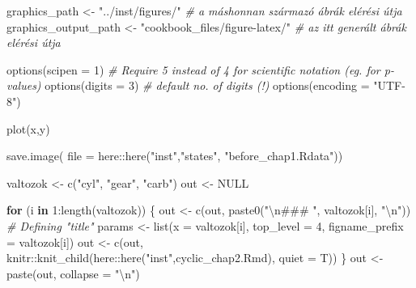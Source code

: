 \documentclass[
]{article}
\newenvironment{Shaded}{\begin{snugshade}}{\end{snugshade}}
\newcommand{\AttributeTok}[1]{\textcolor[rgb]{0.77,0.63,0.00}{#1}}
\newcommand{\CommentTok}[1]{\textcolor[rgb]{0.56,0.35,0.01}{\textit{#1}}}
\newcommand{\ConstantTok}[1]{\textcolor[rgb]{0.00,0.00,0.00}{#1}}
\newcommand{\ControlFlowTok}[1]{\textcolor[rgb]{0.13,0.29,0.53}{\textbf{#1}}}
\newcommand{\DecValTok}[1]{\textcolor[rgb]{0.00,0.00,0.81}{#1}}
\newcommand{\FunctionTok}[1]{\textcolor[rgb]{0.00,0.00,0.00}{#1}}
\newcommand{\NormalTok}[1]{#1}
\newcommand{\OtherTok}[1]{\textcolor[rgb]{0.56,0.35,0.01}{#1}}
\newcommand{\SpecialCharTok}[1]{\textcolor[rgb]{0.00,0.00,0.00}{#1}}
\newcommand{\StringTok}[1]{\textcolor[rgb]{0.31,0.60,0.02}{#1}}
\begin{document}
\begin{Shaded}
\begin{Highlighting}[]
\NormalTok{graphics\_path }\OtherTok{\textless{}{-}} \StringTok{"../inst/figures/"}            \CommentTok{\# a máshonnan származó ábrák elérési útja}
\NormalTok{graphics\_output\_path }\OtherTok{\textless{}{-}} \StringTok{"cookbook\_files/figure{-}latex/"} \CommentTok{\# az itt generált ábrák elérési útja}

\FunctionTok{options}\NormalTok{(}\AttributeTok{scipen =} \DecValTok{1}\NormalTok{) }\CommentTok{\# Require 5 instead of 4 for scientific notation (eg. for p{-}values)}
\FunctionTok{options}\NormalTok{(}\AttributeTok{digits =} \DecValTok{3}\NormalTok{) }\CommentTok{\# default no. of digits (!) }
\FunctionTok{options}\NormalTok{(}\AttributeTok{encoding =} \StringTok{"UTF{-}8"}\NormalTok{) }

\FunctionTok{plot}\NormalTok{(x,y)}

\FunctionTok{save.image}\NormalTok{( }\AttributeTok{file =}\NormalTok{ here}\SpecialCharTok{::}\FunctionTok{here}\NormalTok{(}\StringTok{"inst"}\NormalTok{,}\StringTok{"states"}\NormalTok{, }\StringTok{"before\_chap1.Rdata"}\NormalTok{))}

\NormalTok{valtozok }\OtherTok{\textless{}{-}} \FunctionTok{c}\NormalTok{(}\StringTok{"cyl"}\NormalTok{, }\StringTok{"gear"}\NormalTok{, }\StringTok{"carb"}\NormalTok{)}
\NormalTok{out }\OtherTok{\textless{}{-}} \ConstantTok{NULL}

\ControlFlowTok{for}\NormalTok{ (i }\ControlFlowTok{in} \DecValTok{1}\SpecialCharTok{:}\FunctionTok{length}\NormalTok{(valtozok)) \{}
\NormalTok{  out }\OtherTok{\textless{}{-}} \FunctionTok{c}\NormalTok{(out, }\FunctionTok{paste0}\NormalTok{(}\StringTok{"}\SpecialCharTok{\textbackslash{}n}\StringTok{\#\#\# "}\NormalTok{, valtozok[i], }\StringTok{"}\SpecialCharTok{\textbackslash{}n}\StringTok{"}\NormalTok{)) }\CommentTok{\# Defining "title"}
\NormalTok{  params }\OtherTok{\textless{}{-}} \FunctionTok{list}\NormalTok{(}\AttributeTok{x              =}\NormalTok{ valtozok[i],}
                 \AttributeTok{top\_level      =} \DecValTok{4}\NormalTok{,}
                 \AttributeTok{figname\_prefix =}\NormalTok{ valtozok[i])}
\NormalTok{  out }\OtherTok{\textless{}{-}} \FunctionTok{c}\NormalTok{(out,}
\NormalTok{           knitr}\SpecialCharTok{::}\FunctionTok{knit\_child}\NormalTok{(here}\SpecialCharTok{::}\FunctionTok{here}\NormalTok{(}\StringTok{"inst"}\NormalTok{,}\StringTok{\textquotesingle{}cyclic\_chap2.Rmd\textquotesingle{}}\NormalTok{),}
                             \AttributeTok{quiet =}\NormalTok{ T))}
\NormalTok{\}}
\NormalTok{out }\OtherTok{\textless{}{-}} \FunctionTok{paste}\NormalTok{(out, }\AttributeTok{collapse =} \StringTok{"}\SpecialCharTok{\textbackslash{}n}\StringTok{"}\NormalTok{)}


\end{Highlighting}
\end{Shaded}
\end{document}
